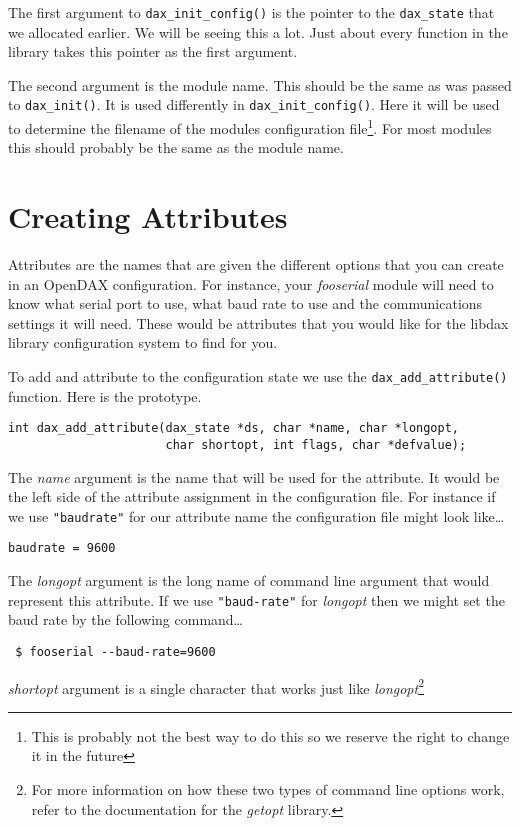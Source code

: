 The first argument to \verb|dax_init_config()| is the pointer to the
\verb|dax_state| that we allocated earlier.  We will be seeing this a lot.  Just
about every function in the library takes this pointer as the first argument.

The second argument is the module name.  This should be the same as was passed
to \verb|dax_init()|.  It is used differently in \verb|dax_init_config()|.  Here
it will be used to determine the filename of the modules configuration
file\footnote{This is probably not the best way to do this so we reserve the
right to change it in the future}.  For most modules this should probably be the
same as the module name.

\section{Creating Attributes} Attributes are the names that
are given the different options that you can create in an OpenDAX configuration.
For instance, your \textit{fooserial} module will need to know what serial port
to use, what baud rate to use and the communications settings it will need.
These would be attributes that you would like for the libdax library
configuration system to find for you.

To add and attribute to the configuration state we use the
\verb|dax_add_attribute()| function.  Here
is the prototype.

\begin{verbatim}
int dax_add_attribute(dax_state *ds, char *name, char *longopt,
                      char shortopt, int flags, char *defvalue);
\end{verbatim}

The \textit{name} argument is the name that will be used for the attribute.  It
would be the left side of the attribute assignment in the configuration file.
For instance if we use \texttt{"baudrate"} for our attribute name the
configuration file might look like\ldots

\begin{verbatim}
baudrate = 9600
\end{verbatim}

The \textit{longopt} argument is the long name of command line argument that
would represent this attribute.  If we use \texttt{"baud-rate"} for
\textit{longopt} then we might set the baud rate by the following command\ldots

\begin{verbatim} $ fooserial --baud-rate=9600 \end{verbatim} %
\textit{shortopt} argument is a single character that works just like
\textit{longopt}\footnote{For more information on how these two types of command
line options work, refer to the documentation for the \textit{getopt} library.}

